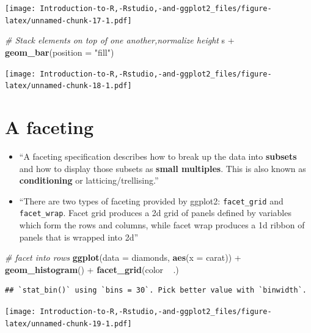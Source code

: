 \documentclass[]{book}
\newenvironment{Shaded}{\begin{snugshade}}{\end{snugshade}}
\newcommand{\KeywordTok}[1]{\textcolor[rgb]{0.13,0.29,0.53}{\textbf{{#1}}}}
\newcommand{\DataTypeTok}[1]{\textcolor[rgb]{0.13,0.29,0.53}{{#1}}}
\newcommand{\StringTok}[1]{\textcolor[rgb]{0.31,0.60,0.02}{{#1}}}
\newcommand{\CommentTok}[1]{\textcolor[rgb]{0.56,0.35,0.01}{\textit{{#1}}}}
\newcommand{\NormalTok}[1]{{#1}}
\begin{document}
\texttt{[image: Introduction-to-R,-Rstudio,-and-ggplot2\_files/figure-latex/unnamed-chunk-17-1.pdf]}

\begin{Shaded}
\begin{Highlighting}[]
\CommentTok{# Stack elements on top of one another,normalize height}
\NormalTok{s +}\StringTok{ }\KeywordTok{geom_bar}\NormalTok{(}\DataTypeTok{position =} \StringTok{"fill"}\NormalTok{)}
\end{Highlighting}
\end{Shaded}

\texttt{[image: Introduction-to-R,-Rstudio,-and-ggplot2\_files/figure-latex/unnamed-chunk-18-1.pdf]}

\section{A faceting}\label{a-faceting}

\begin{itemize}
\item
  ``A faceting specification describes how to break up the data into
  \textbf{subsets} and how to display those subsets as \textbf{small
  multiples}. This is also known as \textbf{conditioning} or
  latticing/trellising.'' \citep{ggplot2}
\item
  ``There are two types of faceting provided by ggplot2:
  \texttt{facet\_grid} and \texttt{facet\_wrap}. Facet grid produces a
  2d grid of panels defined by variables which form the rows and
  columns, while facet wrap produces a 1d ribbon of panels that is
  wrapped into 2d'' \citep{ggplot2}
\end{itemize}

\begin{Shaded}
\begin{Highlighting}[]
\CommentTok{# facet into rows}
\KeywordTok{ggplot}\NormalTok{(}\DataTypeTok{data =} \NormalTok{diamonds, }\KeywordTok{aes}\NormalTok{(}\DataTypeTok{x =} \NormalTok{carat)) +}\StringTok{ }\KeywordTok{geom_histogram}\NormalTok{() +}\StringTok{ }\KeywordTok{facet_grid}\NormalTok{(color ~}\StringTok{ }\NormalTok{.)}
\end{Highlighting}
\end{Shaded}

\begin{verbatim}
## `stat_bin()` using `bins = 30`. Pick better value with `binwidth`.
\end{verbatim}

\texttt{[image: Introduction-to-R,-Rstudio,-and-ggplot2\_files/figure-latex/unnamed-chunk-19-1.pdf]}
\end{document}

